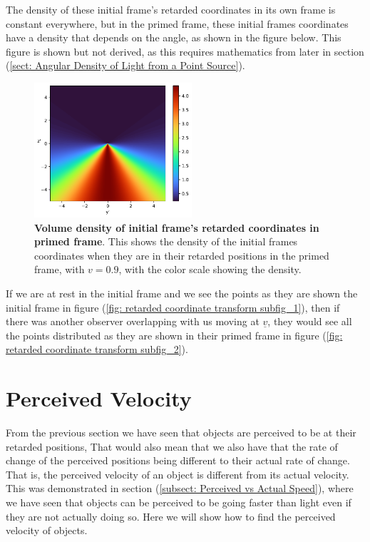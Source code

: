 The density of these initial frame's retarded coordinates in its own frame is constant everywhere, but in the primed frame, these initial frames coordinates have a density that depends on the angle, as shown in the figure below.
This figure is shown but not derived, as this requires mathematics from later in section (\ref{sect: Angular Density of Light from a Point Source}).

\begin{figure}[H]
	\centering
	\includegraphics[height=5cm]{images/pdf/coord_transform_Retarded_Coordinate_Density_Transform.pdf}
	\caption{\textbf{Volume density of initial frame's retarded coordinates in primed frame}. This shows the density of the initial frames coordinates when they are in their retarded positions in the primed frame, with $v=0.9$, with the color scale showing the density.}
	\label{fig: Density of initial frame's retarded coordinates in primed frame}
\end{figure}

If we are at rest in the initial frame and we see the points as they are shown the initial frame in figure (\ref{fig: retarded coordinate transform subfig_1}), then if there was another observer overlapping with us moving at $\underline{v}$, they would see all the points distributed as they are shown in their primed frame in figure (\ref{fig: retarded coordinate transform subfig_2}).

\section{Perceived Velocity} \label{sect: Perceived Velocity}

From the previous section we have seen that objects are perceived to be at their retarded positions, That would also mean that we also have that the rate of change of the perceived positions being different to their actual rate of change.
That is, the perceived velocity of an object is different from its actual velocity.
This was demonstrated in section (\ref{subsect: Perceived vs Actual Speed}), where we have seen that objects can be perceived to be going faster than light even if they are not actually doing so.
Here we will show how to find the perceived velocity of objects.

